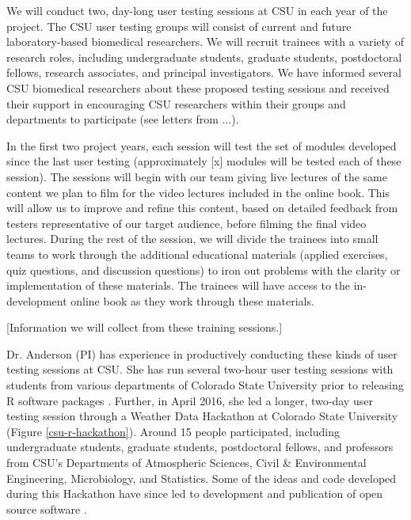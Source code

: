 \documentclass[pdftex,english,11pt,parskip=half]{scrartcl}
\begin{document}
We will conduct two, day-long user testing sessions at CSU in each year of the project. The CSU user testing groups will consist of current and future laboratory-based biomedical researchers. We will recruit trainees with a variety of research roles, including undergraduate students, graduate students, postdoctoral fellows, research associates, and principal investigators. We have informed several CSU biomedical researchers about these proposed testing sessions and received their support in encouraging CSU researchers within their groups and departments to participate (see letters from ...). 

In the first two project years, each session will test the set of modules developed since the last user testing (approximately [x] modules will be tested each of these session). The sessions will begin with our team giving live lectures of the same content we plan to film for the video lectures included in the online book. This will allow us to improve and refine this content, based on detailed feedback from testers representative of our target audience, before filming the final video lectures. During the rest of the session, we will divide the trainees into small teams to work through the additional educational materials (applied exercises, quiz questions, and discussion questions) to iron out problems with the clarity or implementation of these materials. The trainees will have access to the in-development online book as they work through these materials.

[Information we will collect from these training sessions.]

Dr. Anderson (PI) has experience in productively conducting these kinds of user testing sessions at CSU. She has run several two-hour user testing sessions with students from various departments of Colorado State University prior to releasing R software packages \cite{futureheatwaves, countyweather}. Further, in April 2016, she led a longer, two-day user testing session through a Weather Data Hackathon at Colorado State University (Figure \ref{csu-r-hackathon}). Around 15 people participated, including undergraduate students, graduate students, postdoctoral fellows, and professors from CSU's Departments of Atmospheric Sciences, Civil \& Environmental Engineering, Microbiology, and Statistics. Some of the ideas and code developed during this Hackathon have since led to development and publication of open source software \cite{countyfloods, noaastormevents}.
\end{document}
